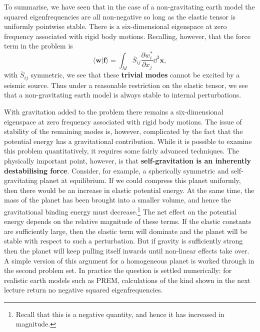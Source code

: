 To summarise, we have seen that in the case of a non-gravitating earth model the squared eigenfrequencies are all non-negative so
 long as the elastic tensor is uniformly pointwise stable. There is a six-dimensional eigenspace at zero frequency associated with rigid body motions.
  Recalling, however, that the force term in the problem is
\begin{equation}
\langle \mathbf{w}|\mathbf{f}\rangle=\int_{M}\overline{S}_{ij}\frac{\partial w_{i}^{*}}{\partial x_{j}}\dd^{3}\mathbf{x},
\label{eq:44}
\end{equation}
with $\overline{S}_{ij}$ symmetric, we see that these \textbf{trivial modes} cannot be excited by a seismic source. Thus under a reasonable restriction on 
the elastic tensor, we see that a non-gravitating earth model is always stable to internal perturbations.

With gravitation added to the problem there remains a six-dimensional eigenspace at zero frequency associated with rigid body motions. 
The issue of stability of the remaining modes is, however, complicated by the fact that the potential energy has a gravitational contribution.
While it is possible to examine this problem quantitatively, it requires some fairly advanced techniques. The physically important point, however,
is that \textbf{self-gravitation is an inherently destabilising force}. Consider, for example, a spherically symmetric and self-gravitating planet 
at equilibrium. If we could compress this planet uniformly, then there would be an increase in elastic potential energy. At the same time, the mass 
of the planet has been brought into a smaller volume, and hence the gravitational binding energy must decrease.\footnote{Recall that this is a negative
quantity, and hence it has increased in magnitude.} The net effect on the potential energy depends on the relative magnitude of these terms. 
If the elastic constants are sufficiently large, then the elastic term will dominate and the planet will be stable with respect to such a perturbation. 
But if gravity is sufficiently strong then the planet will keep pulling itself inwards until non-linear effects take over.
A simple version of this argument for a homogeneous planet is worked through in the second problem set. In practice the question
is settled numerically: for realistic earth models such as PREM, calculations of the kind shown in the next lecture return no
negative squared eigenfrequencies.


